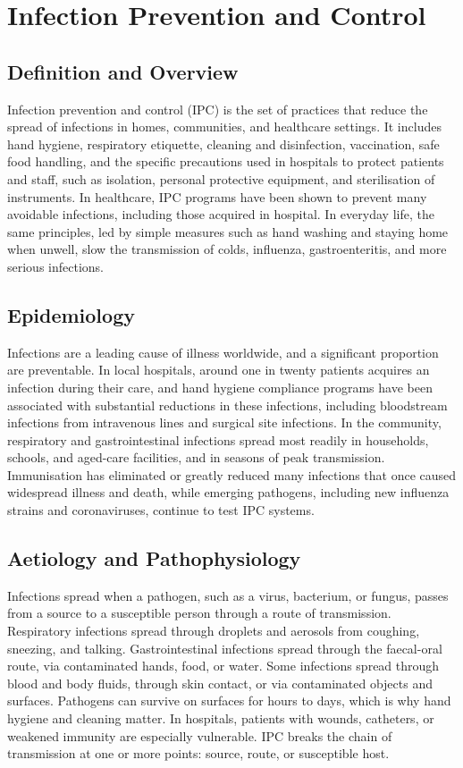 \chapter{Infection Prevention and Control}

\section*{Definition and Overview}
Infection prevention and control (IPC) is the set of practices that reduce the spread of infections in homes, communities, and healthcare settings. It includes hand hygiene, respiratory etiquette, cleaning and disinfection, vaccination, safe food handling, and the specific precautions used in hospitals to protect patients and staff, such as isolation, personal protective equipment, and sterilisation of instruments. In healthcare, IPC programs have been shown to prevent many avoidable infections, including those acquired in hospital. In everyday life, the same principles, led by simple measures such as hand washing and staying home when unwell, slow the transmission of colds, influenza, gastroenteritis, and more serious infections.

\section*{Epidemiology}
Infections are a leading cause of illness worldwide, and a significant proportion are preventable. In local hospitals, around one in twenty patients acquires an infection during their care, and hand hygiene compliance programs have been associated with substantial reductions in these infections, including bloodstream infections from intravenous lines and surgical site infections. In the community, respiratory and gastrointestinal infections spread most readily in households, schools, and aged-care facilities, and in seasons of peak transmission. Immunisation has eliminated or greatly reduced many infections that once caused widespread illness and death, while emerging pathogens, including new influenza strains and coronaviruses, continue to test IPC systems.

\section*{Aetiology and Pathophysiology}
Infections spread when a pathogen, such as a virus, bacterium, or fungus, passes from a source to a susceptible person through a route of transmission. Respiratory infections spread through droplets and aerosols from coughing, sneezing, and talking. Gastrointestinal infections spread through the faecal-oral route, via contaminated hands, food, or water. Some infections spread through blood and body fluids, through skin contact, or via contaminated objects and surfaces. Pathogens can survive on surfaces for hours to days, which is why hand hygiene and cleaning matter. In hospitals, patients with wounds, catheters, or weakened immunity are especially vulnerable. IPC breaks the chain of transmission at one or more points: source, route, or susceptible host.

